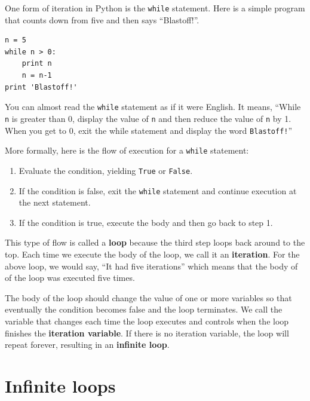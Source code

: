 \documentclass[10pt]{book}
\begin{document}
One form of iteration in Python is the {\tt while} statement.  Here is 
a simple program that counts down from five and then says ``Blastoff!''.

\beforeverb
\begin{verbatim}
n = 5
while n > 0:
    print n
    n = n-1
print 'Blastoff!'
\end{verbatim}
\afterverb
%
You can almost read the {\tt while} statement as if it were English.
It means, ``While {\tt n} is greater than 0,
display the value of {\tt n} and then reduce the value of
{\tt n} by 1.  When you get to 0, exit the while statement and
display the word {\tt Blastoff!}''


More formally, here is the flow of execution for a {\tt while} statement:

\begin{enumerate}

\item Evaluate the condition, yielding {\tt True} or {\tt False}.

\item If the condition is false, exit the {\tt while} statement
and continue execution at the next statement.

\item If the condition is true, execute the
body and then go back to step 1.

\end{enumerate}

This type of flow is called a {\bf loop} because the third step
loops back around to the top.  Each time we execute the body of 
the loop, we call it an {\bf iteration}.  For the above loop, we 
would say, ``It had five iterations'' which means that the body of
of the loop was executed five times.


The body of the loop should change the value of one or more variables
so that eventually the condition becomes false and the loop
terminates.  
We call the variable that changes each time the loop
executes and controls when the loop finishes the 
{\bf iteration variable}.
If there is no iteration variable, the loop will repeat forever, 
resulting in an {\bf infinite loop}.  

\section{Infinite loops}
\end{document}

